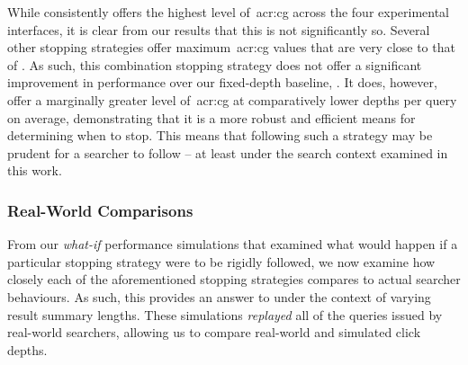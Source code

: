 While  consistently offers the highest level of~\gls{acr:cg} across the four experimental interfaces, it is clear from our results that this is not significantly so. Several other stopping strategies offer maximum~\gls{acr:cg} values that are very close to that of . As such, this combination stopping strategy does not offer a significant improvement in performance over our fixed-depth baseline, . It does, however, offer a marginally greater level of~\gls{acr:cg} at comparatively lower depths per query on average, demonstrating that it is a more robust and efficient means for determining when to stop. This means that following such a strategy may be prudent for a searcher to follow -- at least under the search context examined in this work.

\subsubsection{Real-World Comparisons}\label{sec:snippets:simulations:results:comparisons}
From our \emph{what-if} performance simulations that examined what would happen if a particular stopping strategy were to be rigidly followed, we now examine how closely each of the aforementioned stopping strategies compares to actual searcher behaviours. As such, this provides an answer to  under the context of varying result summary lengths. These simulations \emph{replayed} all of the queries issued by real-world searchers, allowing us to compare real-world and simulated click depths.

